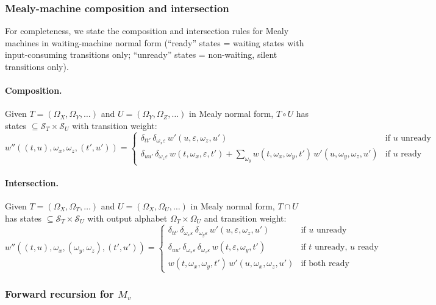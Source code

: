 \subsubsection{Mealy-machine composition and intersection}
\label{sec:mealy-ops}

For completeness, we state the composition and intersection rules
for Mealy machines in waiting-machine normal form
(``ready'' states = waiting states with input-consuming transitions only;
``unready'' states = non-waiting, silent transitions only).

\paragraph{Composition.}
Given $T = (\Omega_X, \Omega_Y, \ldots)$ and $U = (\Omega_Y, \Omega_Z, \ldots)$
in Mealy normal form,
$T \circ U$ has states $\subseteq \mathcal{S}_T \times \mathcal{S}_U$ with transition weight:
\[
w''((t,u), \omega_x, \omega_z, (t',u')) = \begin{cases}
\delta_{tt'}\, \delta_{\omega_x\varepsilon}\, w'(u,\varepsilon,\omega_z,u')
& \text{if } u \text{ unready} \\[4pt]
\delta_{uu'}\, \delta_{\omega_z\varepsilon}\, w(t,\omega_x,\varepsilon,t')
+ \displaystyle\sum_{\omega_y} w(t,\omega_x,\omega_y,t')\, w'(u,\omega_y,\omega_z,u')
& \text{if } u \text{ ready}
\end{cases}
\]

\paragraph{Intersection.}
Given $T = (\Omega_X, \Omega_T, \ldots)$ and $U = (\Omega_X, \Omega_U, \ldots)$
in Mealy normal form,
$T \cap U$ has states $\subseteq \mathcal{S}_T \times \mathcal{S}_U$
with output alphabet $\Omega_T \times \Omega_U$ and transition weight:
\[
w''((t,u), \omega_x, (\omega_y,\omega_z), (t',u')) = \begin{cases}
\delta_{tt'}\, \delta_{\omega_x\varepsilon}\, \delta_{\omega_y\varepsilon}\, w'(u,\varepsilon,\omega_z,u')
& \text{if } u \text{ unready} \\[4pt]
\delta_{uu'}\, \delta_{\omega_x\varepsilon}\, \delta_{\omega_z\varepsilon}\, w(t,\varepsilon,\omega_y,t')
& \text{if } t \text{ unready, } u \text{ ready} \\[4pt]
w(t,\omega_x,\omega_y,t')\, w'(u,\omega_x,\omega_z,u')
& \text{if both ready}
\end{cases}
\]

\subsubsection{Forward recursion for $M_v$}
\label{sec:forward-mv}

